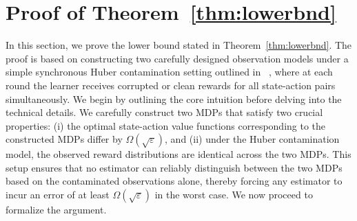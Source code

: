 \documentclass{article}
\begin{document}
\newpage
\section{Proof of Theorem~\ref{thm:lowerbnd}}
\label{app:lowerbnd}
In this section, we prove the lower bound stated in Theorem~\ref{thm:lowerbnd}. The proof is based on constructing two carefully designed observation models under a simple synchronous Huber contamination setting outlined in ~\cite{kearns, even2003learning, sidford}, where at each round the learner receives corrupted or clean rewards for all state-action pairs simultaneously.
We begin by outlining the core intuition before delving into the technical details. We carefully construct two MDPs that satisfy two crucial properties: (i) the optimal state-action value functions corresponding to the constructed MDPs differ by \(\Omega(\sqrt{\varepsilon})\), and (ii) under the Huber contamination model, the observed reward distributions are identical across the two MDPs. This setup ensures that no estimator can reliably distinguish between the two MDPs based on the contaminated observations alone, thereby forcing any estimator to incur an error of at least \(\Omega(\sqrt{\varepsilon})\) in the worst case. We now proceed to formalize the argument.
\end{document}
